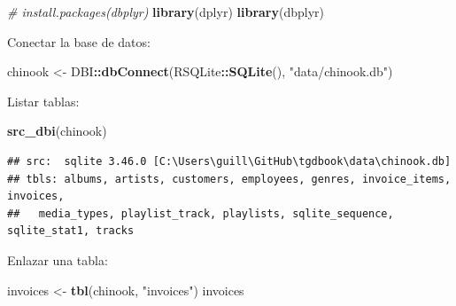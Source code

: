 \documentclass[
]{book}
\newenvironment{Shaded}{\begin{snugshade}}{\end{snugshade}}
\newcommand{\CommentTok}[1]{\textcolor[rgb]{0.56,0.35,0.01}{\textit{#1}}}
\newcommand{\FunctionTok}[1]{\textcolor[rgb]{0.13,0.29,0.53}{\textbf{#1}}}
\newcommand{\NormalTok}[1]{#1}
\newcommand{\OtherTok}[1]{\textcolor[rgb]{0.56,0.35,0.01}{#1}}
\newcommand{\SpecialCharTok}[1]{\textcolor[rgb]{0.81,0.36,0.00}{\textbf{#1}}}
\newcommand{\StringTok}[1]{\textcolor[rgb]{0.31,0.60,0.02}{#1}}
\begin{document}
\begin{Shaded}
\begin{Highlighting}[]
\CommentTok{\# install.packages(\textquotesingle{}dbplyr\textquotesingle{})}
\FunctionTok{library}\NormalTok{(dplyr)}
\FunctionTok{library}\NormalTok{(dbplyr)}
\end{Highlighting}
\end{Shaded}

Conectar la base de datos:

\begin{Shaded}
\begin{Highlighting}[]
\NormalTok{chinook }\OtherTok{\textless{}{-}}\NormalTok{ DBI}\SpecialCharTok{::}\FunctionTok{dbConnect}\NormalTok{(RSQLite}\SpecialCharTok{::}\FunctionTok{SQLite}\NormalTok{(), }\StringTok{"data/chinook.db"}\NormalTok{)}
\end{Highlighting}
\end{Shaded}

Listar tablas:

\begin{Shaded}
\begin{Highlighting}[]
\FunctionTok{src\_dbi}\NormalTok{(chinook)}
\end{Highlighting}
\end{Shaded}

\begin{verbatim}
## src:  sqlite 3.46.0 [C:\Users\guill\GitHub\tgdbook\data\chinook.db]
## tbls: albums, artists, customers, employees, genres, invoice_items, invoices,
##   media_types, playlist_track, playlists, sqlite_sequence, sqlite_stat1, tracks
\end{verbatim}

Enlazar una tabla:

\begin{Shaded}
\begin{Highlighting}[]
\NormalTok{invoices }\OtherTok{\textless{}{-}} \FunctionTok{tbl}\NormalTok{(chinook, }\StringTok{"invoices"}\NormalTok{)}
\NormalTok{invoices}
\end{Highlighting}
\end{Shaded}
\end{document}
